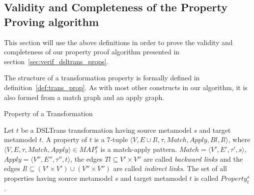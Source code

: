 
\subsection{Validity and Completeness of the Property Proving algorithm}

This section will use the above definitions in order to prove the validity and completeness of our property proof algorithm presented in section~\ref{sec:verif_dsltrans_props}. %



The structure of a transformation property is formally defined in definition~\ref{def:trans_prop}. As with most other constructs in our algorithm, it is also formed from a match graph and an apply graph.

\begin{definition}{Property of a Transformation}
\label{def:trans_prop}

Let $t$ be a DSLTrans transformation having source metamodel $s$ and target
metamodel $t$. A property of $t$ is a 7-tuple $\langle V,E\cup
Il,\tau,Match,Apply,Bl,Il\rangle$, where \\$\langle V,E,\tau,Match,Apply\rangle
\in MAP^{s}_{t}$ is a match-apply pattern. $Match=\langle V',E',\tau',s\rangle$,
$Apply=\langle V'',E'',\tau'',t\rangle$, the edges $Tl\subseteq V'\times V''$
are called \emph{backward links} and the edges $Il\subseteq (V'\times V')\cup
(V''\times V'')$ are called \emph{indirect links}. The set of all properties
having source metamodel $s$ and target metamodel $t$ is called
$Property^{s}_{t}$.
\end{definition}

